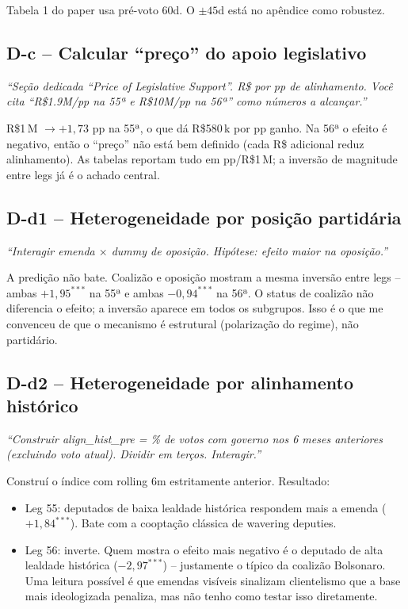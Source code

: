 \documentclass[11pt,a4paper]{article}
\newcommand{\pedido}[1]{\par\medskip\noindent\textit{\textcolor{quotegray}{#1}}\par\smallskip}
\begin{document}
Tabela 1 do paper usa pré-voto 60d. O $\pm 45$d está no apêndice como robustez.

\subsection*{D-c -- Calcular ``preço'' do apoio legislativo}

\pedido{``Seção dedicada ``Price of Legislative Support''. R\$ por pp de alinhamento. Você cita ``R\$1.9M/pp na 55ª e R\$10M/pp na 56ª'' como números a alcançar.''}

R\$1\,M $\to +1{,}73$ pp na 55ª, o que dá R\$580\,k por pp ganho. Na 56ª o efeito é negativo, então o ``preço'' não está bem definido (cada R\$ adicional reduz alinhamento). As tabelas reportam tudo em pp/R\$1\,M; a inversão de magnitude entre legs já é o achado central.

\subsection*{D-d1 -- Heterogeneidade por posição partidária}

\pedido{``Interagir emenda $\times$ dummy de oposição. Hipótese: efeito maior na oposição.''}

A predição não bate. Coalizão e oposição mostram a mesma inversão entre legs -- ambas $+1{,}95^{***}$ na 55ª e ambas $-0{,}94^{***}$ na 56ª. O status de coalizão não diferencia o efeito; a inversão aparece em todos os subgrupos. Isso é o que me convenceu de que o mecanismo é estrutural (polarização do regime), não partidário.

\subsection*{D-d2 -- Heterogeneidade por alinhamento histórico}

\pedido{``Construir align\_hist\_pre = \% de votos com governo nos 6 meses anteriores (excluindo voto atual). Dividir em terços. Interagir.''}

Construí o índice com rolling 6m estritamente anterior. Resultado:
\begin{itemize}[leftmargin=*,itemsep=1pt]
\item Leg 55: deputados de baixa lealdade histórica respondem mais a emenda ($+1{,}84^{***}$). Bate com a cooptação clássica de wavering deputies.
\item Leg 56: inverte. Quem mostra o efeito mais negativo é o deputado de alta lealdade histórica ($-2{,}97^{***}$) -- justamente o típico da coalizão Bolsonaro. Uma leitura possível é que emendas visíveis sinalizam clientelismo que a base mais ideologizada penaliza, mas não tenho como testar isso diretamente.
\end{itemize}
\end{document}
